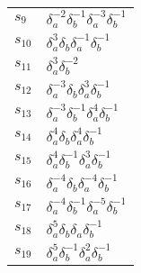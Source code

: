 \documentclass{article}
\begin{document}
\begin{center}
\begin{tabular}{ll}
$s_{9}$ & $\delta_a^{-2}\delta_b^{-1}\delta_a^{-3}\delta_b^{-1}$ \\
$s_{10}$ & $\delta_a^{3}\delta_b^{}\delta_a^{-1}\delta_b^{-1}$ \\
$s_{11}$ & $\delta_a^{3}\delta_b^{-2}$ \\
$s_{12}$ & $\delta_a^{-3}\delta_b^{}\delta_a^{3}\delta_b^{-1}$ \\
$s_{13}$ & $\delta_a^{-3}\delta_b^{-1}\delta_a^{4}\delta_b^{-1}$ \\
$s_{14}$ & $\delta_a^{4}\delta_b^{}\delta_a^{4}\delta_b^{-1}$ \\
$s_{15}$ & $\delta_a^{4}\delta_b^{-1}\delta_a^{3}\delta_b^{-1}$ \\
$s_{16}$ & $\delta_a^{-4}\delta_b^{}\delta_a^{-4}\delta_b^{-1}$ \\
$s_{17}$ & $\delta_a^{-4}\delta_b^{-1}\delta_a^{-5}\delta_b^{-1}$ \\
$s_{18}$ & $\delta_a^{5}\delta_b^{}\delta_a^{}\delta_b^{-1}$ \\
$s_{19}$ & $\delta_a^{5}\delta_b^{-1}\delta_a^{2}\delta_b^{-1}$ \\
\bottomrule
\end{tabular}
\end{center}

\thispagestyle{empty}
\end{document}
